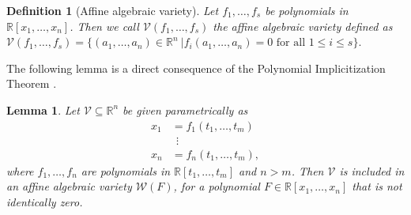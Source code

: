 \documentclass[letterpaper,10pt,journal]{IEEEtran}
\newcommand{\V}{\mathcal{V}}
\newtheorem{definition}{Definition}
\newtheorem{lemma}{Lemma}
\newcommand{\R}{\mathbb R}
\begin{document}
\begin{definition}[Affine algebraic variety]
    Let $f_1,\ldots,f_s$ be polynomials in $\R[x_1,\ldots,x_n]$. Then we call $\V(f_1,\ldots,f_s)$ the affine algebraic variety defined as $\V(f_1,\ldots,f_s)= \{ (a_1,\ldots,a_n)\in \R^n\ | f_i(a_1,\ldots,a_n)=0 \text{ for all } 1\le i\le s\}.$
\end{definition}


The following lemma is a direct consequence of the Polynomial Implicitization Theorem \cite{cox2015ideals}.

\begin{lemma}\label{lemma:algebraic_variety}
Let $\V\subseteq \R^n$ be given parametrically as
    \begin{align*}
    x_1&=f_1(t_1,\ldots,t_m)\\
        &\;\,\vdots\\
        x_n&=f_n(t_1,\ldots,t_m),
    \end{align*}
    where $f_1,\ldots,f_n$ are polynomials in $\R[t_1,\ldots,t_m]$ and $n>m$. Then $\V$ is included in an affine algebraic variety $\mathcal{W}(F)$,  for a polynomial $F\in \R[x_1,\ldots,x_n]$ that is not identically zero. 
\end{lemma}

 
\end{document}
